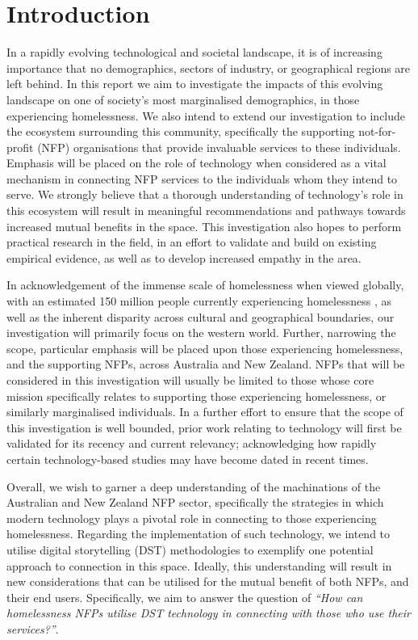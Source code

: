 \chapter{Introduction}

In a rapidly evolving technological and societal landscape, it is of increasing importance that no demographics, sectors of industry, or geographical regions are left behind. In this report we aim to investigate the impacts of this evolving landscape on one of society's most marginalised demographics, in those experiencing homelessness. We also intend to extend our investigation to include the ecosystem surrounding this community, specifically the supporting not-for-profit (NFP) organisations that provide invaluable services to these individuals. Emphasis will be placed on the role of technology when considered as a vital mechanism in connecting NFP services to the individuals whom they intend to serve. We strongly believe that a thorough understanding of technology's role in this ecosystem will result in meaningful recommendations and pathways towards increased mutual benefits in the space. This investigation also hopes to perform practical research in the field, in an effort to validate and build on existing empirical evidence, as well as to develop increased empathy in the area.

In acknowledgement of the immense scale of homelessness when viewed globally, with an estimated 150 million people currently experiencing homelessness \cite{chamie_2017}, as well as the inherent disparity across cultural and geographical boundaries, our investigation will primarily focus on the western world. Further, narrowing the scope, particular emphasis will be placed upon those experiencing homelessness, and the supporting NFPs, across Australia and New Zealand. NFPs that will be considered in this investigation will usually be limited to those whose core mission specifically relates to supporting those experiencing homelessness, or similarly marginalised individuals. In a further effort to ensure that the scope of this investigation is well bounded, prior work relating to technology will first be validated for its recency and current relevancy; acknowledging how rapidly certain technology-based studies may have become dated in recent times.

Overall, we wish to garner a deep understanding of the machinations of the Australian and New Zealand NFP sector, specifically the strategies in which modern technology plays a pivotal role in connecting to those experiencing homelessness. Regarding the implementation of such technology, we intend to utilise digital storytelling (DST) methodologies to exemplify one potential approach to connection in this space. Ideally, this understanding will result in new considerations that can be utilised for the mutual benefit of both NFPs, and their end users. Specifically, we aim to answer the question of \emph{“How can homelessness NFPs utilise DST technology in connecting with those who use their services?”}.

